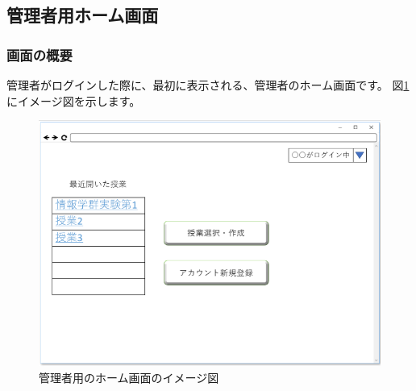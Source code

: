 \newpage

\subsection{管理者用ホーム画面}
\subsubsection{画面の概要}
管理者がログインした際に、最初に表示される、管理者のホーム画面です。
図\ref{fig:04}にイメージ図を示します。

\begin{figure}[htbp]
  \begin{center}
    \includegraphics[width=1\linewidth,clip]{./img/04.png}
    \caption{管理者用のホーム画面のイメージ図}\label{fig:04}
  \end{center}
\end{figure}
